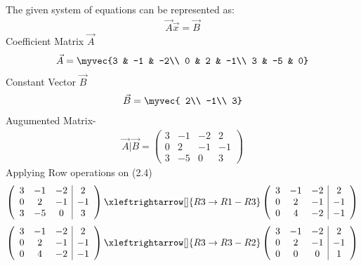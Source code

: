 

The given system of equations can be represented as:
 \begin{align}
 \vec{A}\vec{x}=\vec{B}
 \end{align}
Coefficient Matrix $\vec{A}$
\begin{align}
\vec{A} = \myvec
            {3 & -1 & -2\\
            0 & 2 & -1\\
            3 & -5 & 0}  
\end{align}   
Constant Vector $\vec{B}$
\begin{align}                         
\vec{B} = \myvec{
            2\\
            -1\\
            3}
\end{align}            
Augumented Matrix-
\begin{align}
\vec{A}|\vec{B}=\left(\begin{array}{ccc|c}  
 3 & -1 & -2 & 2\\  
 0 & 2 & -1 & -1\\
 3 & -5 & 0 & 3
\end{array}\right) 
\end{align}
 Applying Row operations on (2.4)\\
\begin{align}
   \left(\begin{array}{ccc|c}  
 3 & -1 & -2 & 2\\  
 0 & 2 & -1 & -1\\
 3 & -5 & 0 & 3
\end{array}\right)\xleftrightarrow[]{R3\rightarrow R1-R3} \left(\begin{array}{ccc|c}  
 3 & -1 & -2 & 2\\  
 0 & 2 & -1 & -1\\
 0 & 4 & -2 & -1
\end{array}\right)
\end{align}
\begin{align}
\left(\begin{array}{ccc|c}  
 3 & -1 & -2 & 2\\  
 0 & 2 & -1 & -1\\
 0 & 4 & -2 & -1
\end{array}\right)\xleftrightarrow[]{R3\rightarrow R3-R2}
\left(\begin{array}{ccc|c}  
 3 & -1 & -2 & 2\\  
 0 & 2 & -1 & -1\\
 0 & 0 & 0 & 1
\end{array}\right)
\end{align}
